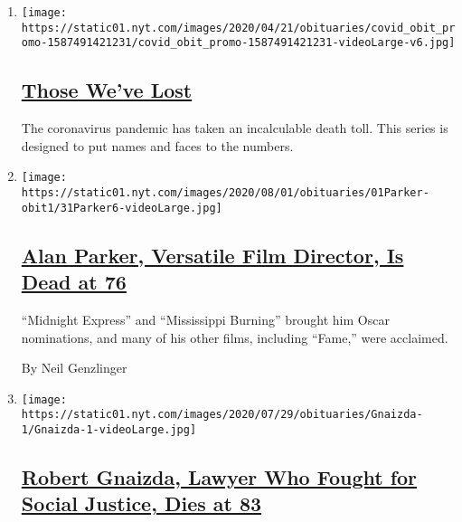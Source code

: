 \begin{enumerate}
\def\labelenumi{\arabic{enumi}.}
\item
  \texttt{[image: https://static01.nyt.com/images/2020/04/21/obituaries/covid\_obit\_promo-1587491421231/covid\_obit\_promo-1587491421231-videoLarge-v6.jpg]}

  \hypertarget{those-weve-lost}{%
  \subsection{\texorpdfstring{\href{https://www.nytimes.com/interactive/2020/obituaries/people-died-coronavirus-obituaries.html}{Those
  We've Lost}}{Those We've Lost}}\label{those-weve-lost}}

  The coronavirus pandemic has taken an incalculable death toll. This
  series is designed to put names and faces to the numbers.
\item
  \texttt{[image: https://static01.nyt.com/images/2020/08/01/obituaries/01Parker-obit1/31Parker6-videoLarge.jpg]}

  \hypertarget{alan-parker-versatile-film-director-is-dead-at-76}{%
  \subsection{\texorpdfstring{\href{/2020/07/31/movies/alan-parker-versatile-film-director-is-dead-at-76.html}{Alan
  Parker, Versatile Film Director, Is Dead at
  76}}{Alan Parker, Versatile Film Director, Is Dead at 76}}\label{alan-parker-versatile-film-director-is-dead-at-76}}

  ``Midnight Express'' and ``Mississippi Burning'' brought him Oscar
  nominations, and many of his other films, including ``Fame,'' were
  acclaimed.

  By Neil Genzlinger
\item
  \texttt{[image: https://static01.nyt.com/images/2020/07/29/obituaries/Gnaizda-1/Gnaizda-1-videoLarge.jpg]}

  \hypertarget{robert-gnaizda-lawyer-who-fought-for-social-justice-dies-at-83}{%
  \subsection{\texorpdfstring{\href{/2020/08/01/us/robert-gnaizda-dead.html}{Robert
  Gnaizda, Lawyer Who Fought for Social Justice, Dies at
  83}}{Robert Gnaizda, Lawyer Who Fought for Social Justice, Dies at 83}}\label{robert-gnaizda-lawyer-who-fought-for-social-justice-dies-at-83}}


\end{enumerate}
